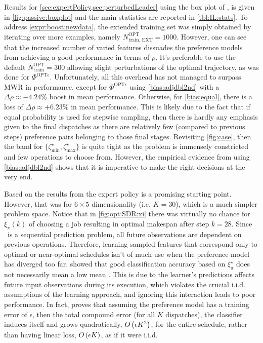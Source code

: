 \documentclass[twocolumn]{svjour3}
\begin{document}
Results for \cref{sec:expertPolicy,sec:perturbedLeader} using the  
box plot of \namerho, is given in \cref{fig:passive:boxplot} and the main 
statistics are reported in \cref{tbl:IL:stats}. 
To address \ref{expr:boost:newdata}, the extended training set was simply 
obtained by iterating over more examples, namely $N^{\text{OPT}}_{\text{train, 
EXT}}=1000$. However, one can see that the increased number of varied features 
dissuades the preference models from achieving a good performance in terms of 
$\rho$. 
It's preferable to use the default $N^{\text{OPT}}_{\text{train}}=300$ 
allowing slight perturbations of the optimal trajectory, as was done for 
$\Phi^{\text{OPT}\epsilon}$. Unfortunately, all this overhead has not managed 
to surpass MWR in performance, except for $\Phi^{\text{OPT}\epsilon}$ using 
\ref{bias:adjdbl2nd} with a $\Delta\rho\approx-4.24\%$ boost in mean 
performance. Otherwise, for \ref{bias:equal}, there is a loss of 
$\Delta\rho\approx+6.23\%$ in mean performance. 
This is likely due to the fact that if equal probability is used for stepwise 
sampling, then there is hardly any emphasis given to the final dispatches as 
there are relatively few (compared to previous steps) preference pairs 
belonging to those final stages.
Revisiting \cref{fig:case}, then the band for 
$\{\zeta^{\star}_{\min},\zeta^{\star}_{\max}\}$ is quite tight as the problem 
is immensely constricted and few operations to choose from. However, the 
empirical evidence from using \ref{bias:adjdbl2nd} shows that it is 
imperative to make the right decisions at the very end.

Based on the results from \cite{InRu11a} the expert policy is a promising 
starting point.
However, that was for $6\times5$ dimensionality (i.e. $K=30$), which is a much 
simpler problem space. Notice that in \cref{fig:opt:SDR:xi} there was 
virtually no chance for $\xi_\pi(k)$ of choosing a job resulting in optimal 
makespan after step $k=28$.
Since \jsp\ is a sequential prediction problem, all future observations are 
dependent on previous operations. 
Therefore, learning sampled features that correspond only to optimal or 
near-optimal schedules isn't of much use when the preference model has 
diverged too far.  showed that good classification 
accuracy based on $\xi^\star_\pi$ does not necessarily mean a low mean \namerho.
This is due to the learner's predictions affects future input observations 
during its execution, which violates the crucial i.i.d. assumptions of the 
learning approach, and ignoring this interaction leads to poor performance.
In fact, \cite{RossB10} proves that assuming the preference model has a 
training error of $\epsilon$, then the total compound error (for all $K$ 
dispatches), the classifier induces itself and grows quadratically, 
${O}\left(\epsilon K^2\right)$, for the entire schedule, rather than having linear 
loss, ${O}\left(\epsilon K\right)$, as if it were i.i.d.
\end{document}
